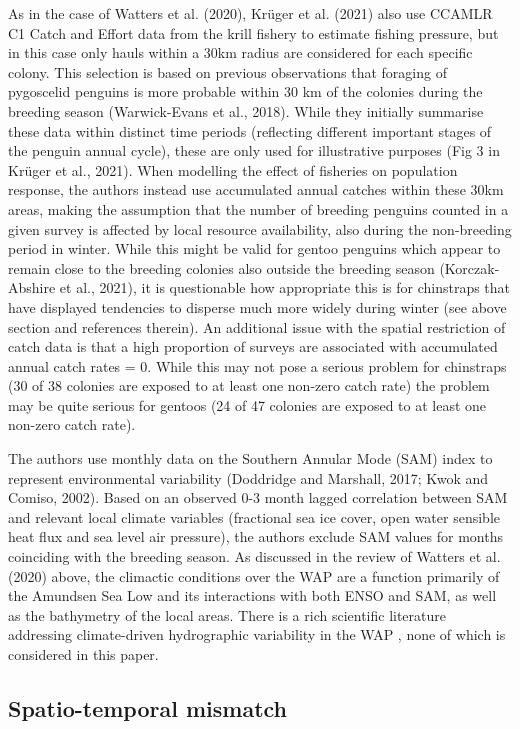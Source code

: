 \documentclass[]{elsarticle} %
\begin{document}
As in the case of Watters et al. (2020), Krüger et al. (2021) also use
CCAMLR C1 Catch and Effort data from the krill fishery to estimate
fishing pressure, but in this case only hauls within a 30km radius are
considered for each specific colony. This selection is based on previous
observations that foraging of pygoscelid penguins is more probable
within 30 km of the colonies during the breeding season (Warwick-Evans
et al., 2018). While they initially summarise these data within distinct
time periods (reflecting different important stages of the penguin
annual cycle), these are only used for illustrative purposes (Fig 3 in
Krüger et al., 2021). When modelling the effect of fisheries on
population response, the authors instead use accumulated annual catches
within these 30km areas, making the assumption that the number of
breeding penguins counted in a given survey is affected by local
resource availability, also during the non-breeding period in winter.
While this might be valid for gentoo penguins which appear to remain
close to the breeding colonies also outside the breeding season
(Korczak-Abshire et al., 2021), it is questionable how appropriate this
is for chinstraps that have displayed tendencies to disperse much more
widely during winter (see above section and references therein). An
additional issue with the spatial restriction of catch data is that a
high proportion of surveys are associated with accumulated annual catch
rates = 0. While this may not pose a serious problem for chinstraps (30
of 38 colonies are exposed to at least one non-zero catch rate) the
problem may be quite serious for gentoos (24 of 47 colonies are exposed
to at least one non-zero catch rate).

The authors use monthly data on the Southern Annular Mode (SAM) index to
represent environmental variability (Doddridge and Marshall, 2017; Kwok
and Comiso, 2002). Based on an observed 0-3 month lagged correlation
between SAM and relevant local climate variables (fractional sea ice
cover, open water sensible heat flux and sea level air pressure), the
authors exclude SAM values for months coinciding with the breeding
season. As discussed in the review of Watters et al. (2020) above, the
climactic conditions over the WAP are a function primarily of the
Amundsen Sea Low and its interactions with both ENSO and SAM, as well as
the bathymetry of the local areas. There is a rich scientific literature
addressing climate-driven hydrographic variability in the WAP , none of
which is considered in this paper.

\hypertarget{spatio-temporal-mismatch}{%
\subsection{Spatio-temporal mismatch}\label{spatio-temporal-mismatch}}
\end{document}
